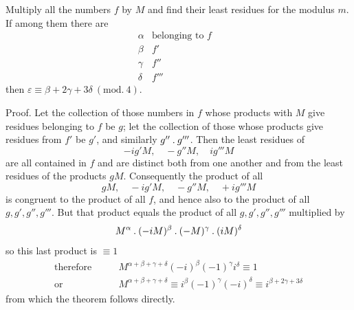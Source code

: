 Multiply all the numbers $f$ by $M$ and find their least residues for the modulus $m$. If among them there are
\[
\begin{array}{cll}
\alpha&\text{belonging to }f&\text{}\\
\beta&f'&\\
\gamma&f''&\\
\delta&f'''&
\end{array}
\]
then $\varepsilon\equiv\beta+2\gamma+3\delta\ (\mathrm{mod.}\ 4)$.

Proof. Let the collection of those numbers in $f$ whose products with $M$ give residues belonging to $f$ be $g$; let the collection of those whose products give residues from $f'$ be $g'$, and similarly $g''\mathbin{.} g'''$. Then the least residues of
\[
-ig'M,\quad -g''M,\quad ig'''M
\]
are all contained in $f$ and are distinct both from one another and from the least residues of the products $gM$. Consequently the product of all
\[
gM,\quad -ig'M,\quad -g''M,\quad +ig'''M
\]
is congruent to the product of all $f$, and hence also to the product of all $g,g',g'',g'''$. But that product equals the product of all $g,g',g'',g'''$ multiplied by
\[
M^{\alpha}\mathbin{.}(-iM)^{\beta}\mathbin{.}(-M)^{\gamma}\mathbin{.}(iM)^{\delta}
\]
so this last product is $\equiv1$
\[
\begin{aligned}
\text{therefore}\qquad&M^{\alpha+\beta+\gamma+\delta}(-i)^{\beta}(-1)^{\gamma}i^{\delta}\equiv1\\
\text{or}\qquad&M^{\alpha+\beta+\gamma+\delta}\equiv i^{\beta}(-1)^{\gamma}(-i)^{\delta}\equiv i^{\beta+2\gamma+3\delta}
\end{aligned}
\]
from which the theorem follows directly.

